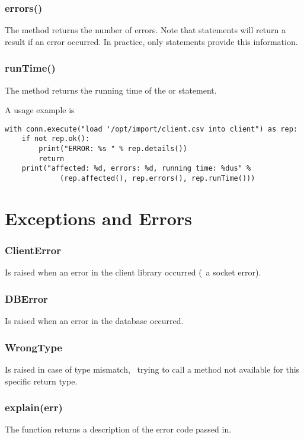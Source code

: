 \subsubsection{errors()}
The method returns the number of errors.
Note that  statements will
return a  result if an error occurred.
In practice, only  statements provide
this information.

\subsubsection{runTime()}
The method returns the running time of 
the  or  statement.

A usage example is

\begin{python}
\begin{lstlisting}
with conn.execute("load '/opt/import/client.csv into client") as rep:
    if not rep.ok():
        print("ERROR: %s " % rep.details())
        return
    print("affected: %d, errors: %d, running time: %dus" % 
             (rep.affected(), rep.errors(), rep.runTime()))
\end{lstlisting}
\end{python}

\section{Exceptions and Errors}
\subsubsection{ClientError}
Is raised when an error in the client library occurred
(\eg\ a socket error).

\subsubsection{DBError}
Is raised when an error in the database occurred.

\subsubsection{WrongType}
Is raised in case of type mismatch, \ie\
trying to call a method not available for
this specific return type.

\subsubsection{explain(err)}
The function  returns
a description of the error code passed in.

